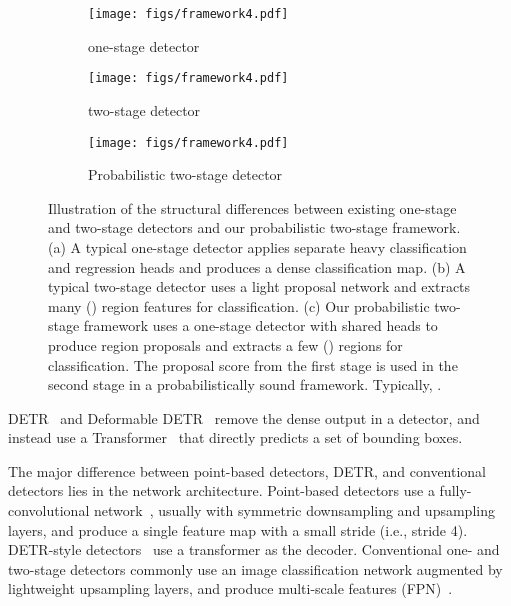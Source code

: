 \documentclass{article}
\begin{document}
\begin{figure*}[t]
\centering
\begin{subfigure}[t]{0.19\linewidth}
\texttt{[image: figs/framework4.pdf]}
\caption{one-stage detector}
\end{subfigure}\hfill
\begin{subfigure}[t]{0.33\linewidth}
\texttt{[image: figs/framework4.pdf]}
\caption{two-stage detector}
\end{subfigure}\hfill
\begin{subfigure}[t]{0.33\linewidth}
\texttt{[image: figs/framework4.pdf]}
\caption{Probabilistic two-stage detector}
\end{subfigure}\vspace{-3mm}
   \caption{
  Illustration of the structural differences between existing one-stage and two-stage detectors and our probabilistic two-stage framework. (a) A typical one-stage detector applies separate heavy classification and regression heads and produces a dense classification map. (b) A typical two-stage detector uses a light proposal network and extracts many () region features for classification. (c) Our probabilistic two-stage framework uses a one-stage detector with shared heads to produce region proposals and extracts a few () regions for classification. The proposal score from the first stage is used in the second stage in a probabilistically sound framework. Typically, .
   }
\label{fig:difference}
\vspace{-4mm}
\end{figure*}

DETR~\cite{carion2020end} and Deformable DETR~\cite{zhu2020deformable} remove the dense output in a detector, and instead use a Transformer~\cite{vaswani2017attention} that directly predicts a set of bounding boxes.

The major difference between point-based detectors, DETR, and conventional detectors lies in the network architecture.
Point-based detectors use a fully-convolutional network~\cite{newell2016stacked,yu2018deep}, usually with symmetric downsampling and upsampling layers, and produce a single feature map with a small stride (i.e., stride 4).
DETR-style detectors~\cite{carion2020end,zhu2020deformable} use a transformer as the decoder.
Conventional one- and two-stage detectors commonly use an image classification network augmented by lightweight upsampling layers, and produce multi-scale features (FPN)~\cite{lin2017feature}.
\end{document}
